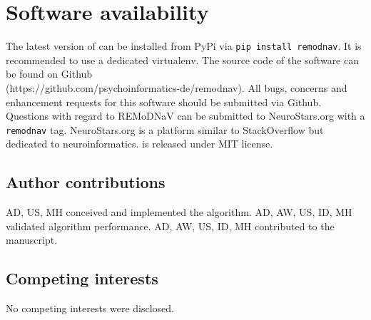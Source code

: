 \section*{Software availability}
The latest version of \remodnav can be installed from PyPi via \texttt{pip install remodnav}. It is recommended to use a dedicated virtualenv. The source code of the software can be found on Github \\ (https://github.com/psychoinformatics-de/remodnav). All bugs, concerns and enhancement requests for this software should be submitted via Github. Questions with regard to REMoDNaV can be submitted to NeuroStars.org with a \texttt{remodnav} tag. NeuroStars.org is a platform similar to StackOverflow but dedicated to neuroinformatics. \remodnav is released under MIT license.



\subsection*{Author contributions}
AD, US, MH conceived and implemented the algorithm.
AD, AW, US, ID, MH validated algorithm performance.
AD, AW, US, ID, MH contributed to the manuscript.

\subsection*{Competing interests}
No competing interests were disclosed.

